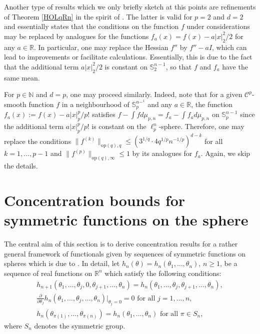 \documentclass[a4paper,12pt]{amsart}
\numberwithin{equation}{section}
\theoremstyle{remark}
\def\R{{\mathbb R}}
\def\N{{\mathbb N}}
\def\S{{\mathbb S}}
\begin{document}
Another type of results which we only briefly sketch at this points are refinements of Theorem \ref{HOLqRn} in the spirit of \cite[Th.\ 1.2]{BCG17}. The latter is valid for $p=2$ and $d=2$ and essentially states that the conditions on the function $f$ under considerations may be replaced by analogues for the functions $f_a(x) = f(x) - a|x|_2^2/2$ for any $a \in \mathbb{R}$. In particular, one may replace the Hessian $f''$ by $f'' - aI$, which can lead to improvements or facilitate calculations. Essentially, this is due to the fact that the additional term $a|x|_2^2/2$ is constant on $\S_2^{n-1}$, so that $f$ and $f_a$ have the same mean.

For $p \in \N$ and $d=p$, one may proceed similarly. Indeed, note that for a given $\mathcal{C}^p$-smooth function $f$ in a neighbourhood of $\S_p^{n-^1}$ and any $a \in \R$, the function $f_a(x) := f(x) - a\lvert x \rvert_p^p/p!$ satisfies $f - \int f d\mu_{p,n} = f_a - \int f_a d\mu_{p,n}$ on $\S_p^{n-1}$ since the additional term $a\lvert x \rvert_p^p/p!$ is constant on the $\ell_p^n$-sphere. Therefore, one may replace the conditions $\lVert f^{(k)} \rVert_{\mathrm{op}(q),q} \le (3^{1/q} \cdot 4 q^{1/p} n^{-1/p})^{d-k}$ for all $k=1,\ldots,p-1$ and $\lVert f^{(p)} \rVert_{\mathrm{op}(q),\infty} \le 1$ by its analogues for $f_a$. Again, we skip the details.

\section{Concentration bounds for symmetric functions on the sphere}\label{ExSect}

The central aim of this section is to derive concentration results for a rather general framework of functionals given by sequences of symmetric functions on spheres which is due to \cite{GNU17}. In detail, let $h_n(\theta) = h_n(\theta_1,\ldots,\theta_n)$, $n \ge 1$, be a sequence of real functions on $\R^n$ which satisfy the following conditions:
\begin{align}
    h_{n+1}(\theta_1,\ldots,\theta_j,0,\theta_{j+1},\ldots, \theta_n) = h_n(\theta_1,\ldots, \theta_j, \theta_{j+1},\ldots, \theta_n),\label{Prop1}\\
    \frac{\partial}{\partial \theta_j} h_n(\theta_1,\ldots, \theta_j,\ldots, \theta_n) \Big|_{\theta_j = 0} = 0 \text{ for all $j=1,\ldots,n$},\label{Prop2}\\
    h_n(\theta_{\pi(1)}, \ldots, \theta_{\pi(n)}) = h_n(\theta_1, \ldots, \theta_n) \text{ for all $\pi \in S_n$},\label{Prop3}
\end{align}
where $S_n$ denotes the symmetric group.
\end{document}

